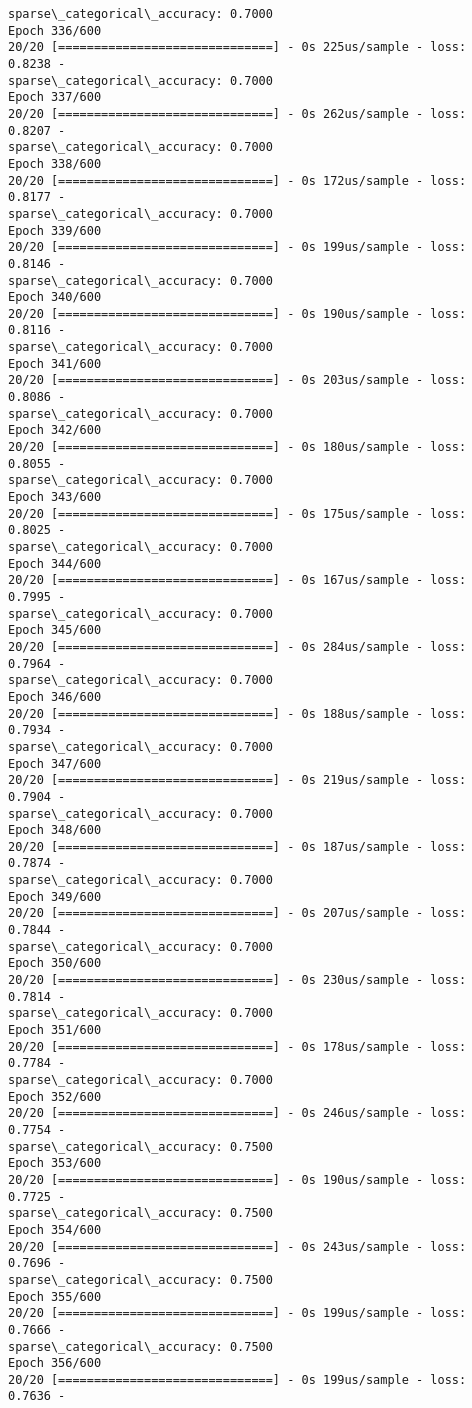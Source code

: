 \documentclass[11pt]{article}
\begin{document}
\begin{Verbatim}[commandchars=\\\{\}]
sparse\_categorical\_accuracy: 0.7000
Epoch 336/600
20/20 [==============================] - 0s 225us/sample - loss: 0.8238 -
sparse\_categorical\_accuracy: 0.7000
Epoch 337/600
20/20 [==============================] - 0s 262us/sample - loss: 0.8207 -
sparse\_categorical\_accuracy: 0.7000
Epoch 338/600
20/20 [==============================] - 0s 172us/sample - loss: 0.8177 -
sparse\_categorical\_accuracy: 0.7000
Epoch 339/600
20/20 [==============================] - 0s 199us/sample - loss: 0.8146 -
sparse\_categorical\_accuracy: 0.7000
Epoch 340/600
20/20 [==============================] - 0s 190us/sample - loss: 0.8116 -
sparse\_categorical\_accuracy: 0.7000
Epoch 341/600
20/20 [==============================] - 0s 203us/sample - loss: 0.8086 -
sparse\_categorical\_accuracy: 0.7000
Epoch 342/600
20/20 [==============================] - 0s 180us/sample - loss: 0.8055 -
sparse\_categorical\_accuracy: 0.7000
Epoch 343/600
20/20 [==============================] - 0s 175us/sample - loss: 0.8025 -
sparse\_categorical\_accuracy: 0.7000
Epoch 344/600
20/20 [==============================] - 0s 167us/sample - loss: 0.7995 -
sparse\_categorical\_accuracy: 0.7000
Epoch 345/600
20/20 [==============================] - 0s 284us/sample - loss: 0.7964 -
sparse\_categorical\_accuracy: 0.7000
Epoch 346/600
20/20 [==============================] - 0s 188us/sample - loss: 0.7934 -
sparse\_categorical\_accuracy: 0.7000
Epoch 347/600
20/20 [==============================] - 0s 219us/sample - loss: 0.7904 -
sparse\_categorical\_accuracy: 0.7000
Epoch 348/600
20/20 [==============================] - 0s 187us/sample - loss: 0.7874 -
sparse\_categorical\_accuracy: 0.7000
Epoch 349/600
20/20 [==============================] - 0s 207us/sample - loss: 0.7844 -
sparse\_categorical\_accuracy: 0.7000
Epoch 350/600
20/20 [==============================] - 0s 230us/sample - loss: 0.7814 -
sparse\_categorical\_accuracy: 0.7000
Epoch 351/600
20/20 [==============================] - 0s 178us/sample - loss: 0.7784 -
sparse\_categorical\_accuracy: 0.7000
Epoch 352/600
20/20 [==============================] - 0s 246us/sample - loss: 0.7754 -
sparse\_categorical\_accuracy: 0.7500
Epoch 353/600
20/20 [==============================] - 0s 190us/sample - loss: 0.7725 -
sparse\_categorical\_accuracy: 0.7500
Epoch 354/600
20/20 [==============================] - 0s 243us/sample - loss: 0.7696 -
sparse\_categorical\_accuracy: 0.7500
Epoch 355/600
20/20 [==============================] - 0s 199us/sample - loss: 0.7666 -
sparse\_categorical\_accuracy: 0.7500
Epoch 356/600
20/20 [==============================] - 0s 199us/sample - loss: 0.7636 -

\end{Verbatim}
\end{document}
